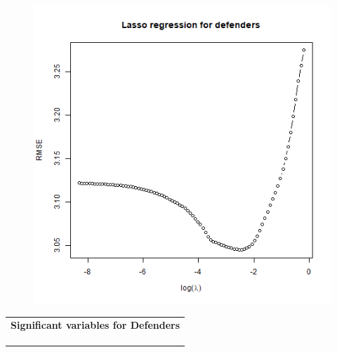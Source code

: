 \begin{table}[H]
\begin{minipage}{.5\textwidth}
\begin{tabular}{c}
    \end{tabular}
\label{tab:sig_var_GLK_1}
\end{minipage}
\end{table}

\begin{table}[H]
\centering
\begin{minipage}{.5\textwidth}
  \centering
  \captionsetup{justification=centering}
    \begin{figure}[H]
        \centering
        \includegraphics[scale=0.4]{fig/chapter_6/lasso_DEF.png}
    \end{figure}
    \label{fig:lasso_DEF_1}
\end{minipage}%
\begin{minipage}{.5\textwidth}
  \centering
  \captionsetup{justification=centering}
    \begin{tabular}{c}
    \textbf{Significant variables for Defenders }\\
    \\
    \\
    \\
    

\end{tabular}
\end{minipage}
\end{table}
